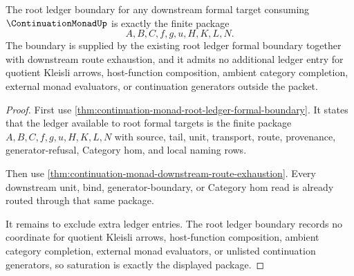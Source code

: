 \begin{theorem}
\label{thm:continuation-monad-root-ledger-saturation-boundary}
The root ledger boundary for any downstream formal target consuming $\ContinuationMonadUp$ is exactly the finite package
$$
A,B,C,f,g,u,H,K,L,N.
$$
The boundary is supplied by the existing root ledger formal boundary together with downstream route exhaustion, and it admits no additional ledger entry for quotient Kleisli arrows, host-function composition, ambient category completion, external monad evaluators, or continuation generators outside the packet.
\end{theorem}
\begin{proof}
First use \autoref{thm:continuation-monad-root-ledger-formal-boundary}. It states that the ledger available to root formal targets is the finite package $A,B,C,f,g,u,H,K,L,N$ with source, tail, unit, transport, route, provenance, generator-refusal, Category hom, and local naming rows.

Then use \autoref{thm:continuation-monad-downstream-route-exhaustion}. Every downstream unit, bind, generator-boundary, or Category hom read is already routed through that same package.

It remains to exclude extra ledger entries. The root ledger boundary records no coordinate for quotient Kleisli arrows, host-function composition, ambient category completion, external monad evaluators, or unlisted continuation generators, so saturation is exactly the displayed package.
\end{proof}

